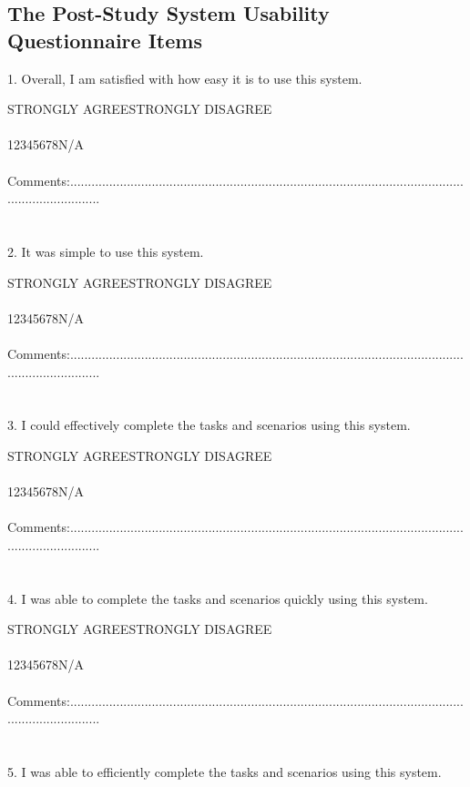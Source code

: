 \newpage
\newcommand{\tab}{\hspace*{4em}}
\begin{appendix}
\section{The Post-Study System Usability Questionnaire Items}
{\parindent0pt

1. Overall, I am satisfied with how easy it is to use this system.

STRONGLY AGREE\tab\tab\tab\tab\tab STRONGLY DISAGREE\\
\\
\tab1\tab2\tab3\tab4\tab5\tab6\tab7\tab8\tab\tab N/A\\
\\
Comments:.........................................................................................................................................\\
\\
\\
2. It was simple to use this system.

STRONGLY AGREE\tab\tab\tab\tab\tab STRONGLY DISAGREE\\
\\
\tab1\tab2\tab3\tab4\tab5\tab6\tab7\tab8\tab\tab N/A\\
\\
Comments:.........................................................................................................................................\\
\\
\\
3. I could effectively complete the tasks and scenarios using this system.

STRONGLY AGREE\tab\tab\tab\tab\tab STRONGLY DISAGREE\\
\\
\tab1\tab2\tab3\tab4\tab5\tab6\tab7\tab8\tab\tab N/A\\
\\
Comments:.........................................................................................................................................\\
\\
\\
4. I was able to complete the tasks and scenarios quickly using this system.

STRONGLY AGREE\tab\tab\tab\tab\tab STRONGLY DISAGREE\\
\\
\tab1\tab2\tab3\tab4\tab5\tab6\tab7\tab8\tab\tab N/A\\
\\
Comments:.........................................................................................................................................\\
\\
\\
5. I was able to efficiently complete the tasks and scenarios using this system.

}
\end{appendix}
